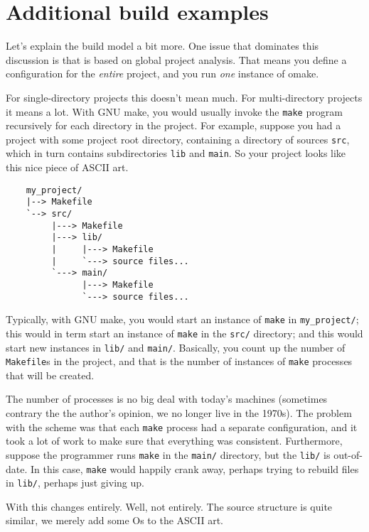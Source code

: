 %
%
%
\chapter{Additional build examples}
\label{chapter:build-examples}

Let's explain the \OMake{} build model a bit more.
One issue that dominates this discussion is that \OMake{} is based on global project analysis.  That
means you define a configuration for the \emph{entire} project, and you run \emph{one} instance of omake.

For single-directory projects this doesn't mean much.  For multi-directory projects it means a lot.
With GNU make, you would usually invoke the \verb+make+ program recursively for each directory in
the project.  For example, suppose you had a project with some project root directory, containing a
directory of sources \verb+src+, which in turn contains subdirectories \verb+lib+ and \verb+main+.
So your project looks like this nice piece of ASCII art.

\begin{verbatim}
    my_project/
    |--> Makefile
    `--> src/
         |---> Makefile
         |---> lib/
         |     |---> Makefile
         |     `---> source files...
         `---> main/
               |---> Makefile
               `---> source files...
\end{verbatim}
                    
Typically, with GNU make, you would start an instance of \verb+make+ in \verb+my_project/+; this
would in term start an instance of \verb+make+ in the \verb+src/+ directory; and this would start
new instances in \verb+lib/+ and \verb+main/+.  Basically, you count up the number of
\verb+Makefile+s in the project, and that is the number of instances of \verb+make+ processes that
will be created.

The number of processes is no big deal with today's machines (sometimes contrary the the author's opinion, we
no longer live in the 1970s).  The problem with the scheme was that each \verb+make+ process had a
separate configuration, and it took a lot of work to make sure that everything was consistent.
Furthermore, suppose the programmer runs \verb+make+ in the \verb+main/+ directory, but the
\verb+lib/+ is out-of-date.  In this case, \verb+make+ would happily crank away, perhaps trying to
rebuild files in \verb+lib/+, perhaps just giving up.

With \OMake{} this changes entirely.  Well, not entirely.  The source structure is quite similar, we
merely add some Os to the ASCII art.


